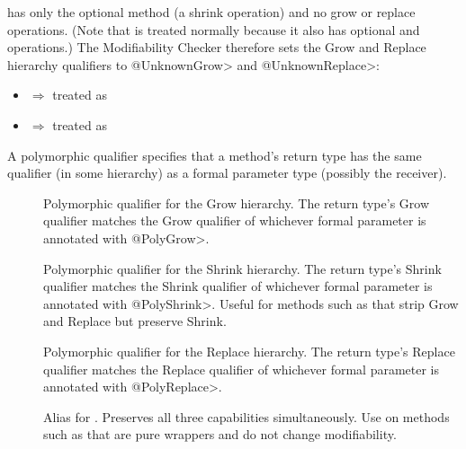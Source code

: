  has only the optional  method (a shrink
operation) and no grow or replace operations.  (Note that
 is treated normally because it also has optional
 and  operations.)  The Modifiability Checker
therefore sets the Grow and Replace hierarchy qualifiers to
\<@UnknownGrow> and \<@UnknownReplace>:

\begin{itemize}
    \item {} $\Rightarrow$
      treated as 
    \item {} $\Rightarrow$
      treated as 
\end{itemize}



A polymorphic qualifier specifies that a method's return type has the
same qualifier (in some hierarchy) as a formal parameter type (possibly
the receiver).

\begin{description}

\item[]
Polymorphic qualifier for the Grow hierarchy.
The return type's Grow qualifier matches the Grow qualifier of whichever
formal parameter is annotated with \<@PolyGrow>.

\item[]
Polymorphic qualifier for the Shrink hierarchy.
The return type's Shrink qualifier matches the Shrink qualifier of
whichever formal parameter is annotated with \<@PolyShrink>.
Useful for methods such as  that strip Grow and
Replace but preserve Shrink.

\item[]
Polymorphic qualifier for the Replace hierarchy.
The return type's Replace qualifier matches the Replace qualifier of
whichever formal parameter is annotated with \<@PolyReplace>.

\item[]
Alias for .
Preserves all three capabilities simultaneously.
Use on methods such as  that are pure
wrappers and do not change modifiability.

\end{description}

